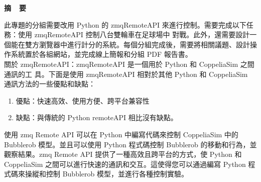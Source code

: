 \renewcommand{\baselinestretch}{1.5} %
\clearpage  %
\sectionef
{} %
\begin{center}
\LARGE\textbf{摘~~要}\\
\end{center}
\begin{flushleft}
\fontsize{14pt}{20pt}\sectionef\hspace{12pt}\quad 此專題的分組需要改用 Python 的 zmqRemoteAPI 來進行控制。需要完成以下任務：使用 zmqRemoteAPI 控制八台雙輪車在足球場中 對戰。此外，還需要設計一個能在雙方瀏覽器中進行計分的系統。每個分組完成後，需要將相關議題、設計操作系統置於各組網站，並完成線上簡報和分組 PDF 報告書。\\[12pt]

\fontsize{14pt}{20pt}\sectionef\hspace{12pt}\quad 關於 zmqRemoteAPI：zmqRemoteAPI 是一個用於 Python 和 CoppeliaSim 之間通訊的工 具。下面是使用 zmqRemoteAPI 相對於其他 Python 和 CoppeliaSim 通訊方法的一些優點和缺點： 
\begin{enumerate}
\item 優點：快速高效、使用方便、跨平台兼容性\\
\item 缺點：與傳統的 Python remoteAPI 相比沒有缺點。\\[12pt]
\end{enumerate}

\fontsize{14pt}{20pt}\sectionef\hspace{12pt}\quad 使用 zmq Remote API 可以在 Python 中編寫代碼來控制 CoppeliaSim 中的 Bubblerob 模型。並且可以使用 Python 程式碼控制 Bubblerob 的移動和行為，並觀察結果。zmq Remote API 提供了一種高效且跨平台的方式，使 Python 和 CoppeliaSim 之間可以進行快速的通訊和交互。這使得您可以通過編寫 Python 程式碼來操縱和控制 Bubblerob 模型，並進行各種控制實驗。
\end{flushleft}
\newpage
\renewcommand{\baselinestretch}{1.5} %
